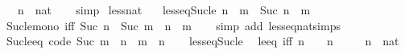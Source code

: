\begin{isabellebody}
\ \ \ n\ {\isacharcolon}{\kern0pt}{\isacharcolon}{\kern0pt}\ nat\isanewline
%
\isadelimproof
\ \ %
\endisadelimproof
%
\isatagproof
{}\isamarkupfalse%
\ simp%
\endisatagproof
{\isafoldproof}%
%
\isadelimproof
\isanewline
%
\endisadelimproof
\isanewline
{}\isamarkupfalse%
\ less{\isacharunderscore}{\kern0pt}nat\isanewline
\ \ \ less{\isacharunderscore}{\kern0pt}eq{\isacharunderscore}{\kern0pt}Suc{\isacharunderscore}{\kern0pt}le{\isacharcolon}{\kern0pt}\ {\isachardoublequoteopen}n\ {\isacharless}{\kern0pt}\ m\ {\isasymlongleftrightarrow}\ Suc\ n\ {\isasymle}\ m{\isachardoublequoteclose}\isanewline
\isanewline
{}\isamarkupfalse%
\ Suc{\isacharunderscore}{\kern0pt}le{\isacharunderscore}{\kern0pt}mono\ {\isacharbrackleft}{\kern0pt}iff{\isacharbrackright}{\kern0pt}{\isacharcolon}{\kern0pt}\ {\isachardoublequoteopen}Suc\ n\ {\isasymle}\ Suc\ m\ {\isasymlongleftrightarrow}\ n\ {\isasymle}\ m{\isachardoublequoteclose}\isanewline
%
\isadelimproof
\ \ %
\endisadelimproof
%
\isatagproof
{}\isamarkupfalse%
\ {\isacharparenleft}{\kern0pt}simp\ add{\isacharcolon}{\kern0pt}\ less{\isacharunderscore}{\kern0pt}eq{\isacharunderscore}{\kern0pt}nat{\isachardot}{\kern0pt}simps{\isacharparenleft}{\kern0pt}{}{\isacharparenright}{\kern0pt}{\isacharparenright}{\kern0pt}%
\endisatagproof
{\isafoldproof}%
%
\isadelimproof
\isanewline
%
\endisadelimproof
\isanewline
{}\isamarkupfalse%
\ Suc{\isacharunderscore}{\kern0pt}le{\isacharunderscore}{\kern0pt}eq\ {\isacharbrackleft}{\kern0pt}code{\isacharbrackright}{\kern0pt}{\isacharcolon}{\kern0pt}\ {\isachardoublequoteopen}Suc\ m\ {\isasymle}\ n\ {\isasymlongleftrightarrow}\ m\ {\isacharless}{\kern0pt}\ n{\isachardoublequoteclose}\isanewline
%
\isadelimproof
\ \ %
\endisadelimproof
%
\isatagproof
{}\isamarkupfalse%
\ less{\isacharunderscore}{\kern0pt}eq{\isacharunderscore}{\kern0pt}Suc{\isacharunderscore}{\kern0pt}le\ \isacommand{{\isachardot}{\kern0pt}{\isachardot}{\kern0pt}}\isamarkupfalse%
%
\endisatagproof
{\isafoldproof}%
%
\isadelimproof
\isanewline
%
\endisadelimproof
\isanewline
{}\isamarkupfalse%
\ le{\isacharunderscore}{\kern0pt}{}{\isacharunderscore}{\kern0pt}eq\ {\isacharbrackleft}{\kern0pt}iff{\isacharbrackright}{\kern0pt}{\isacharcolon}{\kern0pt}\ {\isachardoublequoteopen}n\ {\isasymle}\ {}\ {\isasymlongleftrightarrow}\ n\ {\isacharequal}{\kern0pt}\ {}{\isachardoublequoteclose}\isanewline
\ \ \ n\ {\isacharcolon}{\kern0pt}{\isacharcolon}{\kern0pt}\ nat\isanewline

\end{isabellebody}

